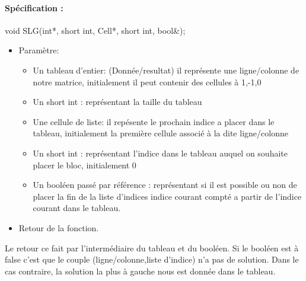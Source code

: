 \documentclass{article}
\begin{document}
\paragraph{Spécification :}
 void SLG(int*, short int, Cell*, short int, bool\&);
\begin{itemize}
\item Param\`etre:
\begin{itemize}
\item Un tableau d'entier: (Donnée/resultat) il représente une ligne/colonne de notre matrice, initialement il peut contenir des cellules à 1,-1,0
\item Un short int : représentant la taille du tableau
\item Une cellule de liste: il repésente le prochain indice a placer dans le tableau, initialement la première cellule associé à la dite ligne/colonne
\item Un short int : représentant l'indice dans le tableau auquel on souhaite placer le bloc, initialement 0
\item Un booléen passé par référence : représentant si il est possible ou non de placer la fin de la liste d'indices indice courant compté a partir de l'indice courant dans le tableau.
\end{itemize}
\item Retour de la fonction.
\end{itemize}
Le retour ce fait par l'intermédiaire du tableau et du booléen. Si le booléen est à false c'est que le couple (ligne/colonne,liste d'indice) n'a pas de solution. Dans le cas contraire, la solution la plus à gauche nous est donnée dans le tableau.
\end{document}

